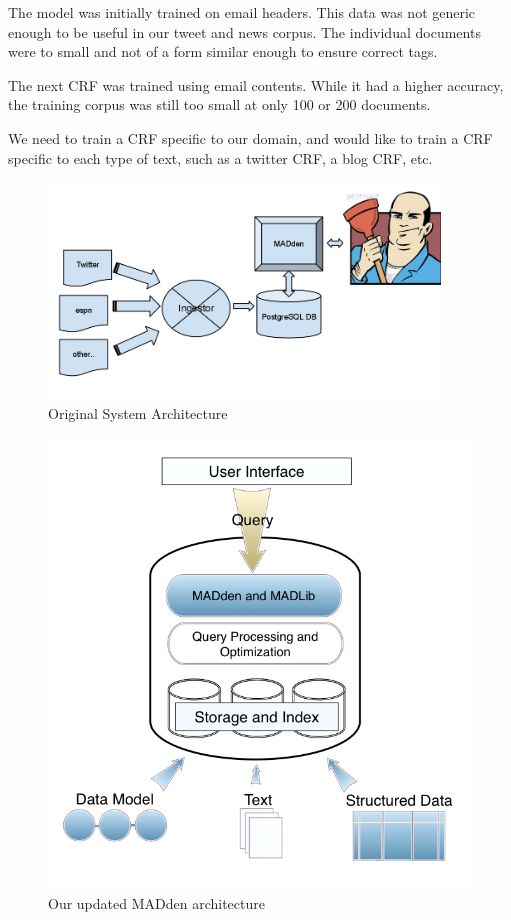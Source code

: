 \documentclass[11pt]{article}
\newcommand{\system}{MADden\xspace}
\begin{document}
    
    The model was initially trained on email headers.
    This data was not generic enough to be useful in our tweet and news corpus.
    The individual documents were to small and not of a form similar enough to ensure correct tags.

    The next CRF was trained using email contents.
    While it had a higher accuracy, the training corpus was still too
		small at only 100 or 200 documents.

    We need to train a CRF specific to our domain,
    and would like to train a CRF specific to each type of text,
    such as a twitter CRF, a blog CRF, etc.

  \begin{figure}
    \begin{center}
      \includegraphics[width=104mm]{architecture-1.png}
      \caption{Original System Architecture}
      \label{fig:architecture}
    \end{center}
  \end{figure}

  \begin{figure}
    \begin{center}
      \includegraphics[scale=0.4]{arch.png}
      \caption{{Our updated \system} architecture}
      \label{fig:arch}
    \end{center}
  \end{figure}
\end{document}
